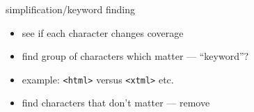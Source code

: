 
\begin{frame}[fragile,label=keywordFinding]{simplification/keyword finding}
    \begin{itemize}
        \item see if each character changes coverage
        \item find group of characters which matter --- ``keyword''?
        \item example: \verb|<html>| versus \verb|<xtml>| etc.
        \item find characters that don't matter --- remove
    \end{itemize}
\end{frame}

